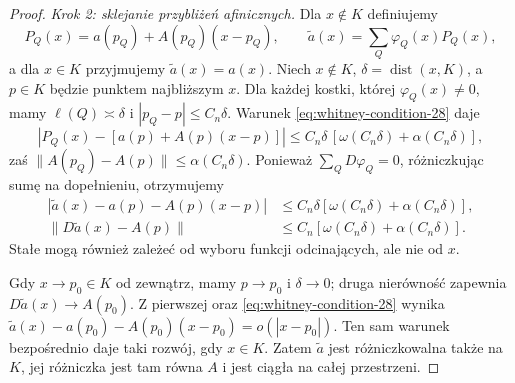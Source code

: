 \begin{proof}
\emph{Krok 2: sklejanie przybliżeń afinicznych.}
Dla $x\notin K$ definiujemy
\[
 P_Q(x)=a(p_Q)+A(p_Q)(x-p_Q),\qquad
 \widetilde a(x)=\sum_Q\varphi_Q(x)P_Q(x),
\]
a dla $x\in K$ przyjmujemy $\widetilde a(x)=a(x)$.
Niech $x\notin K$, $\delta=\operatorname{dist}(x,K)$,
a $p\in K$ będzie punktem najbliższym $x$.
Dla każdej kostki, której $\varphi_Q(x)\ne0$,
mamy $\ell(Q)\asymp\delta$ i $|p_Q-p|\le C_n\delta$.
Warunek \eqref{eq:whitney-condition-28} daje
\[
 |P_Q(x)-[a(p)+A(p)(x-p)]|
 \le C_n\delta\,[\omega(C_n\delta)+\alpha(C_n\delta)],
\]
zaś $\|A(p_Q)-A(p)\|\le\alpha(C_n\delta)$.
Ponieważ $\sum_QD\varphi_Q=0$, różniczkując
sumę na dopełnieniu, otrzymujemy
\begin{align*}
 |\widetilde a(x)-a(p)-A(p)(x-p)|
 &\le C_n\delta[\omega(C_n\delta)+\alpha(C_n\delta)],\\
 \|D\widetilde a(x)-A(p)\|
 &\le C_n[\omega(C_n\delta)+\alpha(C_n\delta)].
\end{align*}
Stałe mogą również zależeć od wyboru funkcji
odcinających, ale nie od $x$.

Gdy $x\to p_0\in K$ od zewnątrz, mamy $p\to p_0$
i $\delta\to0$; druga nierówność zapewnia
$D\widetilde a(x)\to A(p_0)$. Z pierwszej oraz
\eqref{eq:whitney-condition-28} wynika
$\widetilde a(x)-a(p_0)-A(p_0)(x-p_0)=o(|x-p_0|)$.
Ten sam warunek bezpośrednio daje taki rozwój,
gdy $x\in K$. Zatem $\widetilde a$ jest
różniczkowalna także na $K$, jej różniczka jest
tam równa $A$ i jest ciągła na całej przestrzeni.
\end{proof}

